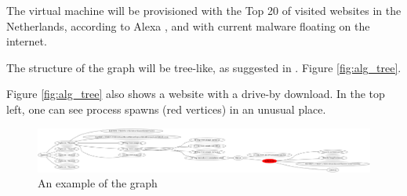 The virtual machine will be provisioned with the Top 20 of visited websites in the Netherlands, according to Alexa \cite{http://www.alexa.com/topsites/countries/NL}, and with current malware floating on the internet.

The structure of the graph will be tree-like, as suggested in . Figure \ref{fig:alg_tree}.

Figure \ref{fig:alg_tree} also shows a website with a drive-by download. In the top left, one can see process spawns (red vertices) in an unusual place.

\begin{figure}[h]
    \centering
    \includegraphics[width=17cm]{Images/alg_tree.png}
    \caption{An example of the graph}
    \label{fig:graph}
\end{figure}

